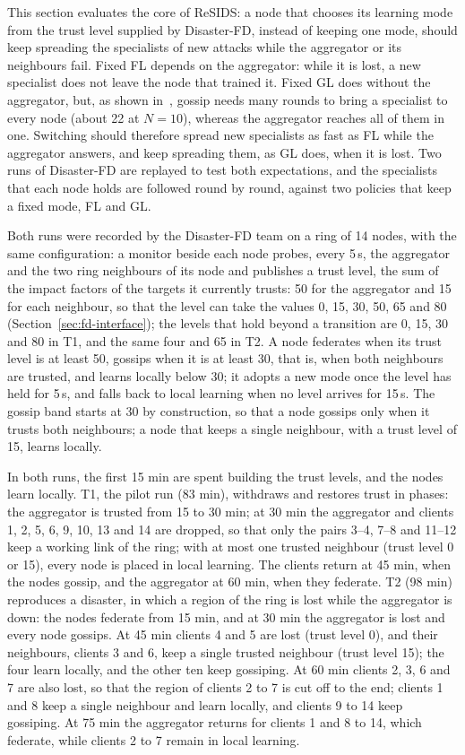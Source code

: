 This section evaluates the core of ReSIDS: a node that chooses its learning mode from the trust level supplied by Disaster-FD, instead of keeping one mode, should keep spreading the specialists of new attacks while the aggregator or its neighbours fail. Fixed FL depends on the aggregator: while it is lost, a new specialist does not leave the node that trained it. Fixed GL does without the aggregator, but, as shown in~\cite{resids-paper1}, gossip needs many rounds to bring a specialist to every node (about 22 at $N{=}10$), whereas the aggregator reaches all of them in one. Switching should therefore spread new specialists as fast as FL while the aggregator answers, and keep spreading them, as GL does, when it is lost. Two runs of Disaster-FD are replayed to test both expectations, and the specialists that each node holds are followed round by round, against two policies that keep a fixed mode, FL and GL.

Both runs were recorded by the Disaster-FD team on a ring of 14 nodes, with the same configuration: a monitor beside each node probes, every 5\,s, the aggregator and the two ring neighbours of its node and publishes a trust level, the sum of the impact factors of the targets it currently trusts: 50 for the aggregator and 15 for each neighbour, so that the level can take the values 0, 15, 30, 50, 65 and 80 (Section~\ref{sec:fd-interface}); the levels that hold beyond a transition are 0, 15, 30 and 80 in T1, and the same four and 65 in T2. A node federates when its trust level is at least 50, gossips when it is at least 30, that is, when both neighbours are trusted, and learns locally below 30; it adopts a new mode once the level has held for 5\,s, and falls back to local learning when no level arrives for 15\,s. The gossip band starts at 30 by construction, so that a node gossips only when it trusts both neighbours; a node that keeps a single neighbour, with a trust level of 15, learns locally.

In both runs, the first 15 min are spent building the trust levels, and the nodes learn locally. T1, the pilot run (83 min), withdraws and restores trust in phases: the aggregator is trusted from 15 to 30 min; at 30 min the aggregator and clients 1, 2, 5, 6, 9, 10, 13 and 14 are dropped, so that only the pairs 3--4, 7--8 and 11--12 keep a working link of the ring; with at most one trusted neighbour (trust level 0 or 15), every node is placed in local learning. The clients return at 45 min, when the nodes gossip, and the aggregator at 60 min, when they federate. T2 (98 min) reproduces a disaster, in which a region of the ring is lost while the aggregator is down: the nodes federate from 15 min, and at 30 min the aggregator is lost and every node gossips. At 45 min clients 4 and 5 are lost (trust level 0), and their neighbours, clients 3 and 6, keep a single trusted neighbour (trust level 15); the four learn locally, and the other ten keep gossiping. At 60 min clients 2, 3, 6 and 7 are also lost, so that the region of clients 2 to 7 is cut off to the end; clients 1 and 8 keep a single neighbour and learn locally, and clients 9 to 14 keep gossiping. At 75 min the aggregator returns for clients 1 and 8 to 14, which federate, while clients 2 to 7 remain in local learning.

